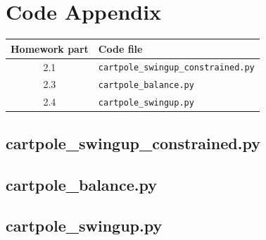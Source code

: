 \section*{Code Appendix}

\begin{tabular}{c|l}
Homework part & Code file\\
\hline
2.1 & \texttt{cartpole\_swingup\_constrained.py}\\
2.3 & \texttt{cartpole\_balance.py}\\
2.4 & \texttt{cartpole\_swingup.py}
\end{tabular}

\subsection*{cartpole\_swingup\_constrained.py}
\label{cartpole_swingup_constrained}


\subsection*{cartpole\_balance.py}
\label{cartpole_balance}


\subsection*{cartpole\_swingup.py}
\label{cartpole_swingup}


